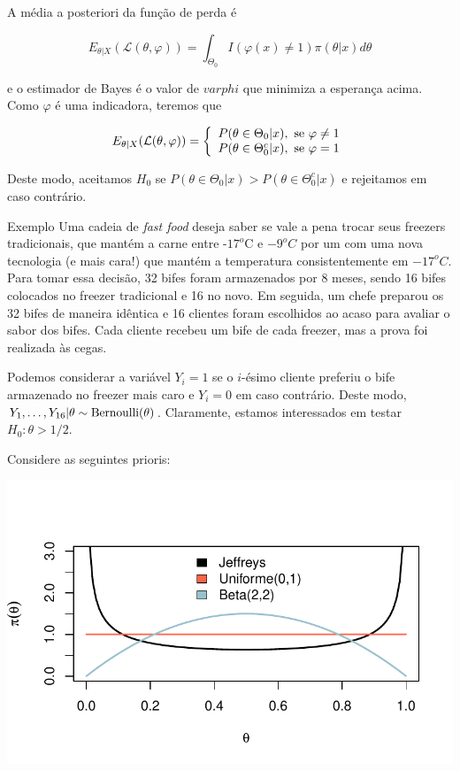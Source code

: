 \documentclass[
  letterpaper,
  DIV=11,
  numbers=noendperiod]{scrreprt}
\theoremstyle{definition}
\theoremstyle{definition}
\theoremstyle{plain}
\theoremstyle{remark}
\begin{document}
A média a posteriori da função de perda é

\[E_{\theta|X}(\mathcal{L}(\theta,\varphi))=\int_{\Theta_0}I(\varphi(x)\neq 1)\pi(\theta|x)d\theta\]

e o estimador de Bayes é o valor de \(varphi\) que minimiza a esperança
acima. Como \(\varphi\) é uma indicadora, teremos que

\[E_{\theta|X}(\mathcal{L}(\theta,\varphi))=\left\{\begin{array}{l}P(\theta\in\Theta_0|x),\hbox{ se }\varphi\neq 1\\
P(\theta\in\Theta_0^c|x),\hbox{ se }\varphi= 1
\end{array}\right.\]

Deste modo, aceitamos \(H_0\) se
\(P(\theta\in\Theta_0|x)>P(\theta\in\Theta_0^c|x)\) e rejeitamos em caso
contrário.

Exemplo Uma cadeia de \emph{fast food} deseja saber se vale a pena
trocar seus freezers tradicionais, que mantém a carne entre -\(17^o\)C e
\(-9^oC\) por um com uma nova tecnologia (e mais cara!) que mantém a
temperatura consistentemente em \(-17^oC\). Para tomar essa decisão, 32
bifes foram armazenados por 8 meses, sendo 16 bifes colocados no freezer
tradicional e 16 no novo. Em seguida, um chefe preparou os 32 bifes de
maneira idêntica e 16 clientes foram escolhidos ao acaso para avaliar o
sabor dos bifes. Cada cliente recebeu um bife de cada freezer, mas a
prova foi realizada às cegas.

Podemos considerar a variável \(Y_i=1\) se o \(i\)-ésimo cliente
preferiu o bife armazenado no freezer mais caro e \(Y_i=0\) em caso
contrário. Deste modo,
\(Y_1,\ldots,Y_{16}|\theta\sim\hbox{Bernoulli}(\theta)\). Claramente,
estamos interessados em testar \(H_0:\theta>1/2\).

Considere as seguintes prioris:

\includegraphics{teste_files/figure-pdf/unnamed-chunk-1-1.pdf}
\end{document}
